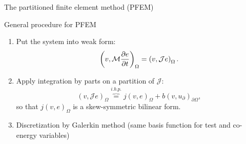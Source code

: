 \documentclass[aspectratio=169]{ISAE-Beamer}
\begin{document}
\begin{frame}{The partitioned finite element method (PFEM)}

\begin{block}{General procedure for PFEM}
	\setlength{\abovedisplayskip}{1pt}
	\setlength{\belowdisplayskip}{1pt}
	\begin{enumerate}
		\item Put the system into weak form:
		\begin{equation*}
		\left(v, \mathcal{M} \diffp{e}{t} \right)_{\Omega} = \left(v, \mathcal{J} e \right)_{\Omega}.
		\end{equation*}
		\item Apply integration by parts on a partition of $\mathcal{J}$:
		\begin{equation*}
		\left(v, \mathcal{J} e \right)_{\Omega} \overbrace{=}^{i.b.p.} j(v, e)_{\Omega} + b(v, u_\partial)_{\partial \Omega},
		\end{equation*}
		so that $j(v, e)_{\Omega}$ is a skew-symmetric bilinear form.
		\item Discretization by Galerkin method (same basis function for test and co-energy variables)
	\end{enumerate}
\end{block}
\end{frame}
\end{document}

